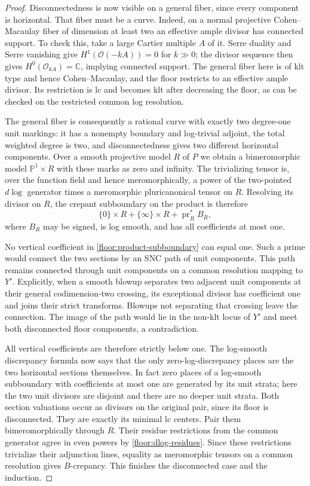 \documentclass[11pt,letterpaper]{article}
\theoremstyle{definition}
\theoremstyle{remark}
\begin{document}
\begin{proof}
Disconnectedness is now visible on a general fiber, since
every component is horizontal.  That fiber must be a
curve.  Indeed, on a normal projective Cohen--Macaulay
fiber of dimension at least two an effective ample
divisor has connected support.  To check this, take a
large Cartier multiple $A$ of it.  Serre duality and
Serre vanishing give $H^1(\mathcal{O}(-kA))=0$ for $k\gg0$;
the divisor sequence then gives
$H^0(\mathcal{O}_{kA})=\mathbb{C}$, implying connected support.
The general fiber here is of klt type and hence
Cohen--Macaulay, and the floor restricts to an effective
ample divisor.  Its restriction is lc and becomes klt
after decreasing the floor, as can be checked on the
restricted common log resolution.

The general fiber is consequently a rational curve with
exactly two degree-one unit markings: it has a nonempty
boundary and log-trivial adjoint, the total weighted
degree is two, and disconnectedness gives two different
horizontal components.  Over a smooth projective model
$R$ of $P$ we obtain a bimeromorphic model
$\mathbb{P}^1\times R$ with these marks as zero and infinity.
The trivializing tensor is, over the function field and
hence meromorphically, a power of the two-pointed
$d\log$ generator times a meromorphic pluricanonical
tensor on $R$.  Resolving its divisor on $R$, the
crepant subboundary on the product is therefore
\begin{equation}
 \label{floor:product-subboundary}
 \{0\}\times R+\{\infty\}\times R
       +\operatorname{pr}_R^*B_R,
\end{equation}
where $B_R$ may be signed, is log smooth, and has all
coefficients at most one.

No vertical coefficient in
\eqref{floor:product-subboundary} can equal one.  Such
a prime would connect the two sections by an SNC path
of unit components.  This path remains connected
through unit components on a common resolution mapping
to $Y'$.  Explicitly, when a smooth blowup separates
two adjacent unit components at their general
codimension-two crossing, its exceptional divisor has
coefficient one and joins their strict transforms.
Blowups not separating that crossing leave the
connection.  The image of the path would lie in the
non-klt locus of $Y'$ and meet both disconnected floor
components, a contradiction.

All vertical coefficients are therefore strictly below
one.  The log-smooth discrepancy formula now says that
the only zero-log-discrepancy places are the two
horizontal sections themselves.  In fact zero places
of a log-smooth subboundary with coefficients at most
one are generated by its unit strata; here the two
unit divisors are disjoint and there are no deeper
unit strata.  Both section valuations occur as
divisors on the original pair, since its floor is
disconnected.  They are exactly its minimal lc
centers.  Pair them bimeromorphically through $R$.
Their residue restrictions from the common generator
agree in even powers by \eqref{floor:dlog-residues}.
Since these restrictions trivialize their adjunction
lines, equality as meromorphic tensors on a common
resolution gives $B$-crepancy.  This finishes the
disconnected case and the induction.
\end{proof}
\end{document}
